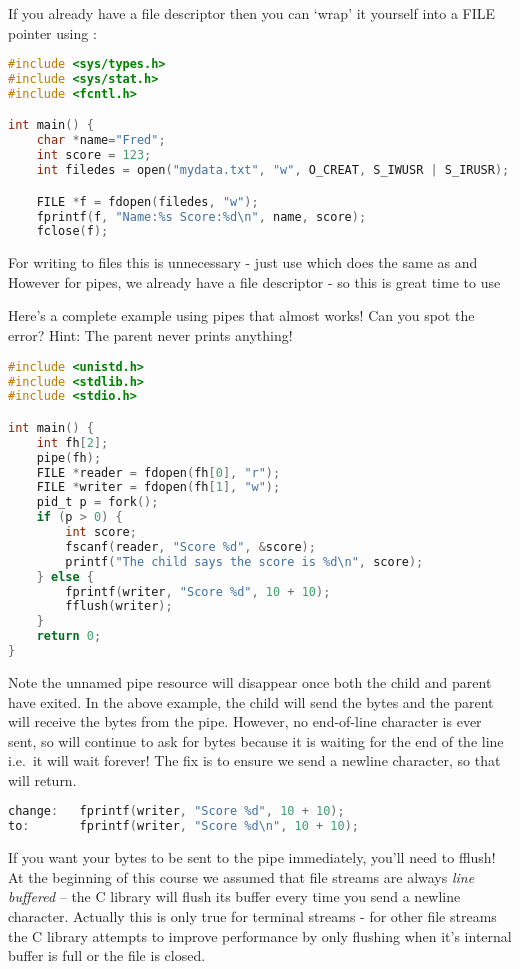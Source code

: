 If you already have a file descriptor then you can `wrap' it yourself into a FILE pointer using  :

\begin{lstlisting}[language=C]
#include <sys/types.h>
#include <sys/stat.h>
#include <fcntl.h>

int main() {
    char *name="Fred";
    int score = 123;
    int filedes = open("mydata.txt", "w", O_CREAT, S_IWUSR | S_IRUSR);

    FILE *f = fdopen(filedes, "w");
    fprintf(f, "Name:%s Score:%d\n", name, score);
    fclose(f);
\end{lstlisting}

For writing to files this is unnecessary - just use  which does the same as  and  However for pipes, we already have a file descriptor - so this is great time to use 

Here's a complete example using pipes that almost works! Can you spot the error? Hint: The parent never prints anything!

\begin{lstlisting}[language=C]
#include <unistd.h>
#include <stdlib.h>
#include <stdio.h>

int main() {
    int fh[2];
    pipe(fh);
    FILE *reader = fdopen(fh[0], "r");
    FILE *writer = fdopen(fh[1], "w");
    pid_t p = fork();
    if (p > 0) {
        int score;
        fscanf(reader, "Score %d", &score);
        printf("The child says the score is %d\n", score);
    } else {
        fprintf(writer, "Score %d", 10 + 10);
        fflush(writer);
    }
    return 0;
}
\end{lstlisting}

Note the unnamed pipe resource will disappear once both the child and parent have exited.
In the above example, the child will send the bytes and the parent will receive the bytes from the pipe.
However, no end-of-line character is ever sent, so  will continue to ask for bytes because it is waiting for the end of the line i.e.~it will wait forever! The fix is to ensure we send a newline character, so that  will return.

\begin{lstlisting}[language=C]
change:   fprintf(writer, "Score %d", 10 + 10);
to:       fprintf(writer, "Score %d\n", 10 + 10);
\end{lstlisting}

If you want your bytes to be sent to the pipe immediately, you'll need to fflush!
At the beginning of this course we assumed that file streams are always \emph{line buffered} -- the C library will flush its buffer every time you send a newline character.
Actually this is only true for terminal streams - for other file streams the C library attempts to improve performance by only flushing when it's internal buffer is full or the file is closed.

